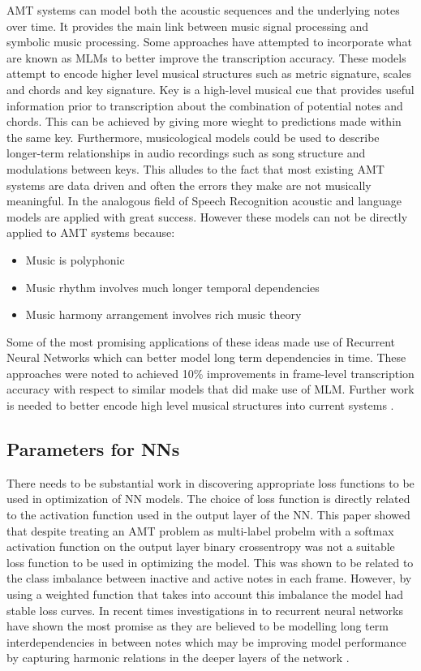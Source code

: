 \ac{AMT} systems can model both the acoustic sequences and the underlying notes over
time. It provides the main link between music signal processing and symbolic
music processing. Some approaches have attempted to incorporate what are known
as \ac{MLM}s to better improve the transcription accuracy. These
models attempt to encode higher level musical structures such as metric
signature, scales and chords and key signature. Key is a high-level musical cue
that provides useful information prior to transcription about the combination of
potential notes and chords. This can be achieved by giving more wieght to
predictions made within the same key. Furthermore, musicological models could be
used to describe longer-term relationships in audio recordings such as song
structure and modulations between keys. This alludes to the fact that most
existing \ac{AMT} systems are data driven and often the errors they make are not
musically meaningful. In the analogous field of Speech Recognition acoustic and
language models are applied with great success. However these models can not be
directly applied to \ac{AMT} systems because:
\begin{itemize}
    \item Music is polyphonic
    \item Music rhythm involves much longer temporal dependencies
    \item Music harmony arrangement involves rich music theory \end{itemize}

Some of the most promising applications of these ideas made use of Recurrent
Neural Networks which can better model long term dependencies in time. These
approaches were noted to achieved 10\% improvements in frame-level transcription
accuracy with respect to similar models that did make use of \ac{MLM}. Further work
is needed to better encode high level musical structures into current systems \cite{amt-note-to-audio:Lewandowski,end-to-end-nn-2016:Sigtia}.

\subsection{Parameters for NNs}
There needs to be substantial work in discovering appropriate loss functions to
be used in optimization of \ac{NN} models. The choice of loss function is directly
related to the activation function used in the output layer of the \ac{NN}. This
paper showed that despite treating an AMT problem as multi-label probelm with a
softmax activation function on the output layer binary crossentropy was not a
suitable loss function to be used in optimizing the model. This was shown to be
related to the class imbalance between inactive and active notes in each frame.
However, by using a weighted function that takes into account this imbalance the
model had stable loss curves. In recent times investigations in to recurrent neural networks have shown the
most promise as they are believed to be modelling long term interdependencies in
between notes which may be improving model performance by capturing harmonic
relations in the deeper layers of the network \cite{end-to-end-nn-2016:Sigtia,amt-note-to-audio:Lewandowski}.


